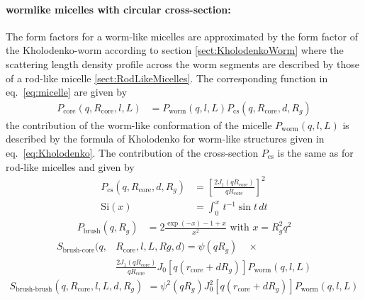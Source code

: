 \paragraph{wormlike micelles with circular cross-section:}
The form factors for a worm-like micelles are approximated by the form factor of the Kholodenko-worm
according to section \ref{sect:KholodenkoWorm} where the scattering length density profile across the worm segments are
described by those of a rod-like micelle \ref{sect:RodLikeMicelles}.
The corresponding function in eq.\ \ref{eq:micelle} are given by
\begin{align}
P_\text{core}(q,R_\text{core},l,L) &= P_\text{worm}(q,l,L) P_\text{cs}(q,R_\text{core},d,R_g)
\label{eq:wormlikeFF}
\end{align}
the contribution of the worm-like conformation of the micelle $P_\text{worm}(q,l,L)$ is described
by the formula of Kholodenko for worm-like structures given in eq.\ \ref{eq:Kholodenko}.
The contribution of the cross-section $P_\text{cs}$ is the same as for rod-like micelles and
given by
\begin{align}
P_\text{cs}(q,R_\text{core},d,R_g) &= \left[ \frac{2J_1(qR_\text{core})}{qR_\text{core}} \right]^2 \\
\text{Si}(x) &= \int_0^x \, t^{-1} \sin t\, dt
\end{align}
\begin{align}
P_\text{brush}(q,R_g)&= 2\frac{\exp(-x)-1+x}{x^2} \text{~with~} x = R_g^2q^2
\end{align}
\begin{align}
S_\text{brush-core}(q,& R_\text{core},l,L,Rg,d) = \psi(qR_g) \quad \times \\
                           & \frac{2J_1(qR_\text{core})}{qR_\text{core}}
                            J_0[q(r_\text{core}+dR_g)]  P_\text{worm}(q,l,L) \nonumber
\end{align}
\begin{align}
S_\text{brush-brush}(q,R_\text{core},l,L,d,R_g) &=
\psi^2(qR_g) J_0^2[q(r_\text{core}+dR_g)]  P_\text{worm}(q,l,L)
\end{align}

\vspace{1cm}

